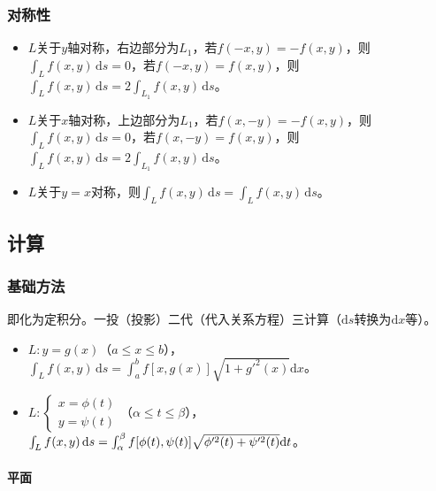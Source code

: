 \documentclass[UTF8, 12pt]{ctexart}
\begin{document}
        \subsubsection{对称性}

        \begin{itemize}
            \item $L$关于$y$轴对称，右边部分为$L_1$，若$f(-x,y)=-f(x,y)$，则$\int_Lf(x,y)\,\textrm{d}s=0$，若$f(-x,y)=f(x,y)$，则$\int_Lf(x,y)\,\textrm{d}s=2\int_{L_1}f(x,y)\,\textrm{d}s$。
            \item $L$关于$x$轴对称，上边部分为$L_1$，若$f(x,-y)=-f(x,y)$，则$\int_Lf(x,y)\,\textrm{d}s=0$，若$f(x,-y)=f(x,y)$，则$\int_Lf(x,y)\,\textrm{d}s=2\int_{L_1}f(x,y)\,\textrm{d}s$。
            \item $L$关于$y=x$对称，则$\int_Lf(x,y)\,\textrm{d}s=\int_Lf(x,y)\,\textrm{d}s$。
        \end{itemize}

        \subsection{计算}

        \subsubsection{基础方法}

        即化为定积分。一投（投影）二代（代入关系方程）三计算（$\textrm{d}s$转换为$\textrm{d}x$等）。

        \begin{itemize}
            \item $L:y=g(x)$（$a\leqslant x\leqslant b$），$\int_Lf(x,y)\,\textrm{d}s=\int_a^bf[x,g(x)]\sqrt{1+g'^2(x)}\textrm{d}x$。
            \item $L:\left\{\begin{array}{c}
                                x=\phi(t) \\
                                y=\psi(t)
            \end{array}\right.$（$\alpha\leqslant t\leqslant\beta$），$\int_Lf(x,y)\,\textrm{d}s=\int_\alpha^\beta f[\phi(t),\psi(t)]\\\sqrt{\phi'^2(t)+\psi'^2(t)}\textrm{d}t$。
        \end{itemize}

        \paragraph{平面} \leavevmode \medskip
\end{document}
